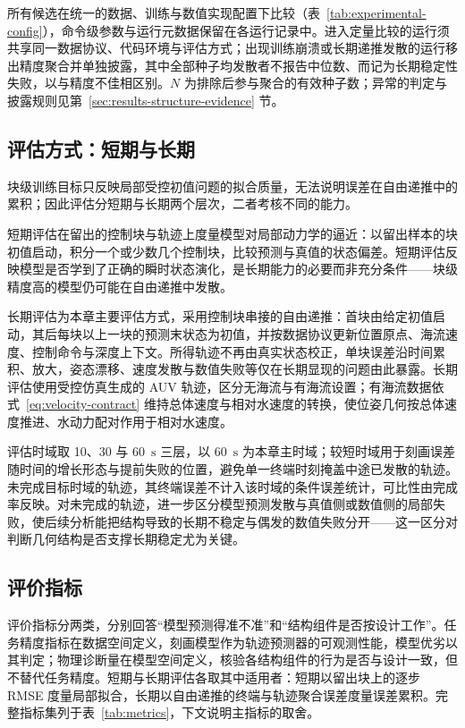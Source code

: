 所有候选在统一的数据、训练与数值实现配置下比较（表~\ref{tab:experimental-config}），命令级参数与运行元数据保留在各运行记录中。进入定量比较的运行须共享同一数据协议、代码环境与评估方式；出现训练崩溃或长期递推发散的运行移出精度聚合并单独披露，其中全部种子均发散者不报告中位数、而记为长期稳定性失败，以与精度不佳相区别。\(N\) 为排除后参与聚合的有效种子数；异常的判定与披露规则见第~\ref{sec:results-structure-evidence} 节。

\subsection{评估方式：短期与长期}
\label{subsec:rollout-eval}

块级训练目标只反映局部受控初值问题的拟合质量，无法说明误差在自由递推中的累积；因此评估分短期与长期两个层次，二者考核不同的能力。

短期评估在留出的控制块与轨迹上度量模型对局部动力学的逼近：以留出样本的块初值启动，积分一个或少数几个控制块，比较预测与真值的状态偏差。短期评估反映模型是否学到了正确的瞬时状态演化，是长期能力的必要而非充分条件——块级精度高的模型仍可能在自由递推中发散。

长期评估为本章主要评估方式，采用控制块串接的自由递推：首块由给定初值启动，其后每块以上一块的预测末状态为初值，并按数据协议更新位置原点、海流速度、控制命令与深度上下文。所得轨迹不再由真实状态校正，单块误差沿时间累积、放大，姿态漂移、速度发散与数值失败等仅在长期显现的问题由此暴露。长期评估使用受控仿真生成的 AUV 轨迹，区分无海流与有海流设置；有海流数据依式~\eqref{eq:velocity-contract} 维持总体速度与相对水速度的转换，使位姿几何按总体速度推进、水动力配对作用于相对水速度。

评估时域取 10、30 与 60~\(\mathrm{s}\) 三层，以 60~\(\mathrm{s}\) 为本章主时域；较短时域用于刻画误差随时间的增长形态与提前失败的位置，避免单一终端时刻掩盖中途已发散的轨迹。未完成目标时域的轨迹，其终端误差不计入该时域的条件误差统计，可比性由完成率反映。对未完成的轨迹，进一步区分模型预测发散与真值侧或数值侧的局部失败，使后续分析能把结构导致的长期不稳定与偶发的数值失败分开——这一区分对判断几何结构是否支撑长期稳定尤为关键。

\subsection{评价指标}
\label{subsec:metrics}

评价指标分两类，分别回答“模型预测得准不准”和“结构组件是否按设计工作”。任务精度指标在数据空间定义，刻画模型作为轨迹预测器的可观测性能，模型优劣以其判定；物理诊断量在模型空间定义，核验各结构组件的行为是否与设计一致，但不替代任务精度。短期与长期评估各取其中适用者：短期以留出块上的逐步 RMSE 度量局部拟合，长期以自由递推的终端与轨迹聚合误差度量误差累积。完整指标集列于表~\ref{tab:metrics}，下文说明主指标的取舍。

